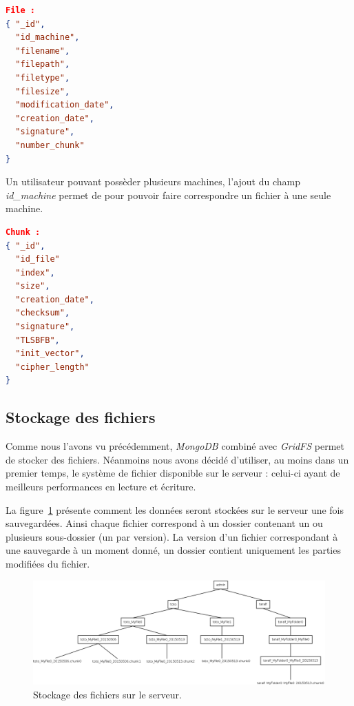 \documentclass[a4paper,10pt, twoside]{report}
\begin{document}
\begin{spacing}{1.2}
\begin{lstlisting}[language=json]
File :
{ "_id",
  "id_machine",
  "filename",
  "filepath",
  "filetype",
  "filesize",
  "modification_date",
  "creation_date",
  "signature",
  "number_chunk"
}
\end{lstlisting}
Un utilisateur pouvant possèder plusieurs machines, l'ajout du champ
\textit{id\_machine} permet de pour pouvoir faire correspondre un fichier à
une seule machine.

\begin{lstlisting}[language=json]
Chunk :
{ "_id",
  "id_file"
  "index",
  "size",
  "creation_date",
  "checksum",
  "signature",
  "TLSBFB",
  "init_vector",
  "cipher_length"
}
\end{lstlisting}

\subsection{Stockage des fichiers}

Comme nous l'avons vu précédemment, \textit{MongoDB} combiné avec
\textit{GridFS} permet de stocker des fichiers. Néanmoins nous avons
décidé d'utiliser, au moins dans un premier temps, le système de fichier
disponible sur le serveur : celui-ci ayant de meilleurs performances en lecture
et écriture.

La figure~\ref{fileSystemServer} présente comment les données seront
stockées sur le serveur une fois sauvegardées. Ainsi chaque fichier
correspond à un dossier contenant un ou plusieurs sous-dossier (un par
version). La version d'un fichier correspondant à une sauvegarde à un moment
donné, un dossier contient uniquement les parties modifiées du fichier.

\begin{figure}[h!]
  \hspace{-4.5em}
  \includegraphics[width=19cm]{softwareDesign/fileSystemServer.png}
  \caption{\label{fileSystemServer} Stockage des fichiers sur le serveur.}
\end{figure}


\end{spacing}
\end{document}
